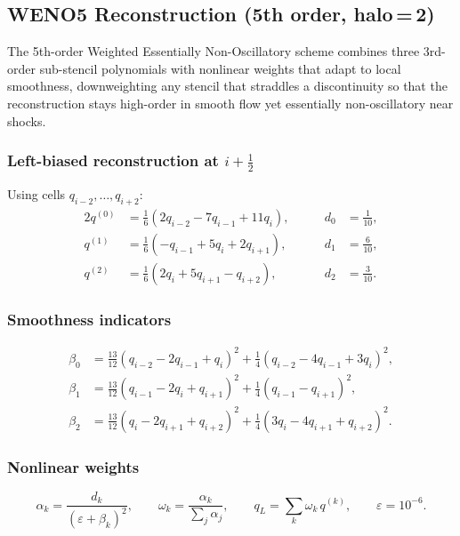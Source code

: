 \documentclass[11pt,a4paper]{article}
\newcommand{\half}{\tfrac{1}{2}}
\begin{document}
\subsection{WENO5 Reconstruction (5th order, halo\,=\,2)}

The 5th-order Weighted Essentially Non-Oscillatory scheme \citep{JiangShu1996} combines three 3rd-order sub-stencil polynomials with nonlinear weights that adapt to local smoothness, downweighting any stencil that straddles a discontinuity so that the reconstruction stays high-order in smooth flow yet essentially non-oscillatory near shocks.

\subsubsection{Left-biased reconstruction at $i\!+\!\half$}
Using cells $q_{i-2},\ldots,q_{i+2}$:
\begin{alignat}{2}
  q^{(0)} &= \tfrac{1}{6}(2q_{i-2}-7q_{i-1}+11q_i),
  &\qquad d_0 &= \tfrac{1}{10},\\
  q^{(1)} &= \tfrac{1}{6}(-q_{i-1}+5q_i+2q_{i+1}),
  &\qquad d_1 &= \tfrac{6}{10},\\
  q^{(2)} &= \tfrac{1}{6}(2q_i+5q_{i+1}-q_{i+2}),
  &\qquad d_2 &= \tfrac{3}{10}.
\end{alignat}

\subsubsection{Smoothness indicators}
\begin{align}
  \beta_0 &= \tfrac{13}{12}(q_{i-2}-2q_{i-1}+q_i)^2 + \tfrac{1}{4}(q_{i-2}-4q_{i-1}+3q_i)^2,\\
  \beta_1 &= \tfrac{13}{12}(q_{i-1}-2q_i+q_{i+1})^2 + \tfrac{1}{4}(q_{i-1}-q_{i+1})^2,\\
  \beta_2 &= \tfrac{13}{12}(q_i-2q_{i+1}+q_{i+2})^2 + \tfrac{1}{4}(3q_i-4q_{i+1}+q_{i+2})^2.
\end{align}

\subsubsection{Nonlinear weights}
\begin{equation}
  \alpha_k = \frac{d_k}{(\varepsilon+\beta_k)^2}, \qquad
  \omega_k = \frac{\alpha_k}{\sum_j\alpha_j}, \qquad
  q_L = \sum_k \omega_k\,q^{(k)}, \qquad \varepsilon=10^{-6}.
\end{equation}
\end{document}
